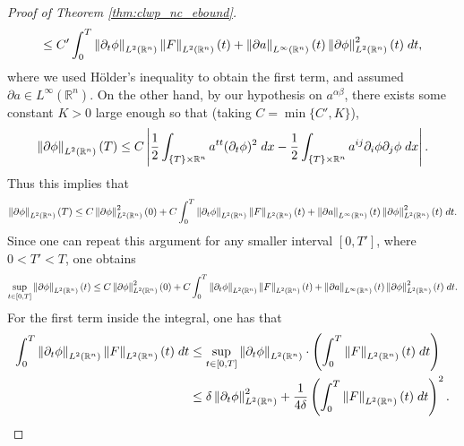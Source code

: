 \documentclass{article}
\begin{document}
\begin{proof}[Proof of Theorem \ref{thm:clwp_nc_ebound}]
\begin{multline*}
		\leq 
		C'\int_{0}^{T}\left\Vert \partial_{t}\phi \right\Vert_{L^{2}(\mathbb{R}^{n})}\left\Vert F \right\Vert_{L^{2}(\mathbb{R}^{n})}(t) + \left\Vert \partial a \right\Vert_{L^{\infty}(\mathbb{R}^{n})}(t)\left\Vert \partial \phi \right\Vert^{2}_{L^{2}(\mathbb{R}^{n})}(t)\;dt, 
	\end{multline*}
	where we used H\"older's inequality to obtain the first term, and assumed $\partial a \in L^{\infty}(\mathbb{R}^{n})$. 
	On the other hand, by our hypothesis on $a^{\alpha\beta}$, there exists some constant $K > 0$ large enough so that (taking $C = \min\{C',K\}$),
	\begin{equation*}
		\left\Vert \partial \phi \right\Vert_{L^{2}(\mathbb{R}^{n})}(T) \leq C\left| \frac{1}{2}\int_{\{T\} \times \mathbb{R}^{n}}a^{tt}(\partial_{t}\phi)^{2}\;dx - \frac{1}{2}\int_{\{T\} \times \mathbb{R}^{n}}a^{ij}\partial_{i}\phi\partial_{j}\phi\;dx \right|. 
	\end{equation*}
	Thus this implies that 
	\begin{multline*}
		\left\Vert \partial \phi \right\Vert_{L^{2}(\mathbb{R}^{n})}(T) \leq C\left\Vert \partial \phi \right\Vert_{L^{2}(\mathbb{R}^{n})}^{2}(0) + C\int_{0}^{T}\left\Vert \partial_{t}\phi \right\Vert_{L^{2}(\mathbb{R}^{n})}\left\Vert F \right\Vert_{L^{2}(\mathbb{R}^{n})}(t) + \left\Vert \partial a \right\Vert_{L^{\infty}(\mathbb{R}^{n})}(t)\left\Vert \partial \phi \right\Vert^{2}_{L^{2}(\mathbb{R}^{n})}(t)\;dt. 
	\end{multline*}
	Since one can repeat this argument for any smaller interval $[0, T']$, where $0 < T' < T$, one obtains 
	\begin{multline*}
		\sup_{t \in [0,T]}\left\Vert \partial \phi \right\Vert_{L^{2}(\mathbb{R}^{n})}(t) \leq C\left\Vert \partial \phi \right\Vert_{L^{2}(\mathbb{R}^{n})}^{2}(0) + C\int_{0}^{T}\left\Vert \partial_{t}\phi \right\Vert_{L^{2}(\mathbb{R}^{n})}\left\Vert F \right\Vert_{L^{2}(\mathbb{R}^{n})}(t) + \left\Vert \partial a \right\Vert_{L^{\infty}(\mathbb{R}^{n})}(t)\left\Vert \partial \phi \right\Vert^{2}_{L^{2}(\mathbb{R}^{n})}(t)\;dt. 
	\end{multline*}
	For the first term inside the integral, one has that 
	\begin{align*}
		\begin{split}
			\int_{0}^{T}\left\Vert \partial_{t}\phi \right\Vert_{L^{2}(\mathbb{R}^{n})}\left\Vert F \right\Vert_{L^{2}(\mathbb{R}^{n})}(t)\;dt &\leq \sup_{t \in [0,T]}\left\Vert \partial_{t}\phi \right\Vert_{L^{2}(\mathbb{R}^{n})} \cdot \left(\int_{0}^{T}\left\Vert F \right\Vert_{L^{2}(\mathbb{R}^{n})}(t)\;dt\right)\\
			&\leq \delta\left\Vert \partial_{t}\phi \right\Vert_{L^{2}(\mathbb{R}^{n})}^{2} + \frac{1}{4\delta}\left(\int_{0}^{T}\left\Vert F \right\Vert_{L^{2}(\mathbb{R}^{n})}(t)\;dt\right)^{2}. 
		\end{split}
	\end{align*}

\end{proof}
\end{document}
